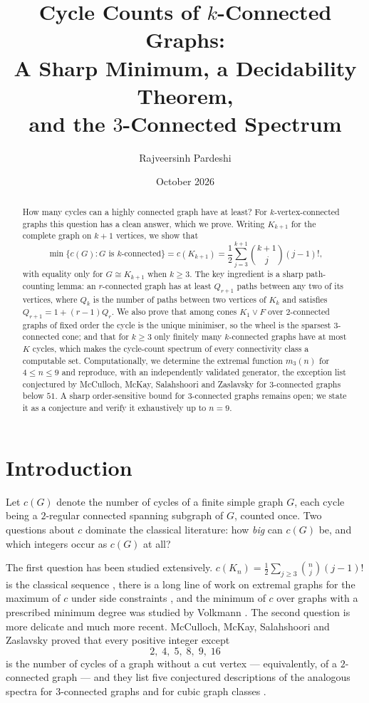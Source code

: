 \documentclass[11pt,a4paper]{article}
\title{\bfseries Cycle Counts of $k$-Connected Graphs:\\
\large A Sharp Minimum, a Decidability Theorem,\\
and the $3$-Connected Spectrum}
\author{Rajveersinh Pardeshi}
\date{October 2026}
\theoremstyle{definition}
\newcommand{\KZ}{K_{k+1}}
\newcommand{\cKn}[1]{c(K_{#1})}
\begin{document}
\maketitle

\begin{abstract}
How many cycles can a highly connected graph have at least?  For
$k$-vertex-connected graphs this question has a clean answer, which we prove.
Writing $\KZ$ for the complete graph on $k+1$ vertices, we show that
\[
\min\{c(G) : G \text{ is } k\text{-connected}\}
   = \cKn{k+1} = \frac12\sum_{j=3}^{k+1}\binom{k+1}{j}(j-1)!,
\]
with equality only for $G\cong\KZ$ when $k\ge 3$.  The key ingredient is a
sharp path-counting lemma: an $r$-connected graph has at least $Q_{r+1}$
paths between any two of its vertices, where $Q_k$ is the number of paths
between two vertices of $K_k$ and satisfies $Q_{r+1}=1+(r-1)Q_r$.  We also
prove that among cones $K_1\vee F$ over $2$-connected graphs of fixed order the
cycle is the unique minimiser, so the wheel is the sparsest $3$-connected
cone; and that for $k\ge 3$ only finitely many $k$-connected graphs have at
most $K$ cycles, which makes the cycle-count spectrum of every connectivity
class a computable set.  Computationally, we determine the extremal function
$m_3(n)$ for $4\le n\le 9$ and reproduce, with an independently validated
generator, the exception list conjectured by McCulloch, McKay, Salahshoori
and Zaslavsky for $3$-connected graphs below $51$.  A sharp order-sensitive
bound for $3$-connected graphs remains open; we state it as a conjecture and
verify it exhaustively up to $n=9$.
\end{abstract}

\section{Introduction}

Let $c(G)$ denote the number of cycles of a finite simple graph $G$, each
cycle being a $2$-regular connected spanning subgraph of $G$, counted once.
Two questions about $c$ dominate the classical literature: how \emph{big} can
$c(G)$ be, and which integers occur as $c(G)$ at all?

The first question has been studied extensively.  $c(K_n)=\frac12\sum_{j\ge 3}
\binom nj (j-1)!$ is the classical sequence \cite{oeisA002807}, there is a
long line of work on extremal graphs for the maximum of $c$ under side
constraints \cite{harary1973graphical}, and the minimum of $c$ over graphs
with a prescribed minimum degree was studied by Volkmann
\cite{volkmann1996}.  The second question is more delicate and much more
recent.  McCulloch, McKay, Salahshoori and Zaslavsky \cite{mcculloch2026}
proved that every positive integer except
\[
  2,\;4,\;5,\;8,\;9,\;16
\]
is the number of cycles of a graph without a cut vertex --- equivalently, of a
$2$-connected graph --- and they list five conjectured descriptions of the
analogous spectra for $3$-connected graphs and for cubic graph classes
\cite{mcculloch2026}.
\end{document}
